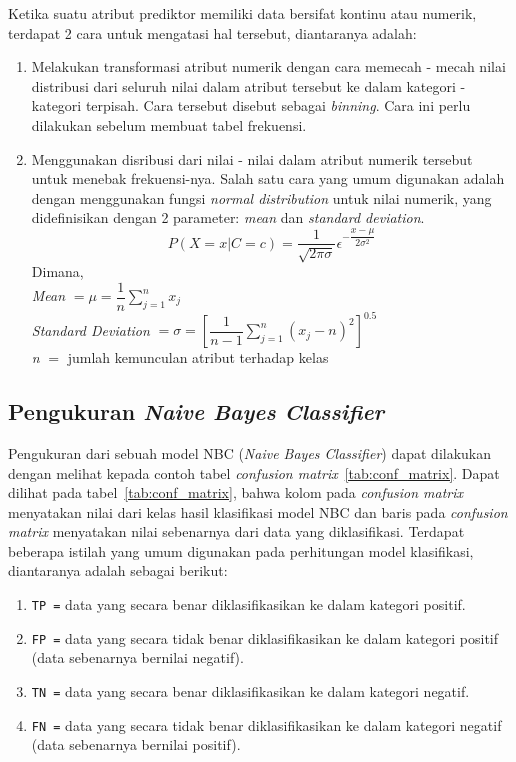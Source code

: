 Ketika suatu atribut prediktor memiliki data bersifat kontinu atau numerik, terdapat 2 cara untuk mengatasi hal tersebut, diantaranya adalah:
\begin{enumerate}
	\item Melakukan transformasi atribut numerik dengan cara memecah - mecah nilai distribusi dari seluruh nilai dalam atribut tersebut ke dalam kategori - kategori terpisah. Cara tersebut disebut sebagai \textit{binning}. Cara ini perlu dilakukan sebelum membuat tabel frekuensi.
	
	\item Menggunakan disribusi dari nilai - nilai dalam atribut numerik tersebut untuk menebak frekuensi-nya. Salah satu cara yang umum digunakan adalah dengan menggunakan fungsi \textit{normal distribution} untuk nilai numerik, yang didefinisikan dengan 2 parameter: \textit{mean} dan \textit{standard deviation}.
	\begin{equation}
	P(X=x|C=c) = \dfrac{1}{\sqrt{2\pi\sigma}}\epsilon^{-\dfrac{x-\mu}{2\sigma^2}}
	\end{equation}
	Dimana,\\
	\textit{Mean} $= \mu = \dfrac{1}{n}\sum^n_{j=1}x_j$\\
	\textit{Standard Deviation} $= \sigma = [\dfrac{1}{n-1}\sum^n_{j=1}(x_j-n)^2]^{0.5}$\\
	\textit{n} $=$ jumlah kemunculan atribut terhadap kelas
	
	
\end{enumerate}

\subsection{Pengukuran \textit{Naive Bayes Classifier}}

Pengukuran dari sebuah model NBC (\textit{Naive Bayes Classifier}) dapat dilakukan dengan melihat kepada contoh tabel \textit{confusion matrix}~\ref{tab:conf_matrix}. Dapat dilihat pada tabel~\ref{tab:conf_matrix}, bahwa kolom pada \textit{confusion matrix} menyatakan nilai dari kelas hasil klasifikasi model NBC dan baris pada \textit{confusion matrix} menyatakan nilai sebenarnya dari data yang diklasifikasi. Terdapat beberapa istilah yang umum digunakan pada perhitungan model klasifikasi, diantaranya adalah sebagai berikut:
\begin{enumerate}
	\item \texttt{TP =} data yang secara benar diklasifikasikan ke dalam kategori positif.
	\item \texttt{FP =} data yang secara tidak benar diklasifikasikan ke dalam kategori positif (data sebenarnya bernilai negatif).
	\item \texttt{TN =} data yang secara benar diklasifikasikan ke dalam kategori negatif.
	\item \texttt{FN =} data yang secara tidak benar diklasifikasikan ke dalam kategori negatif (data sebenarnya bernilai positif).
\end{enumerate}

